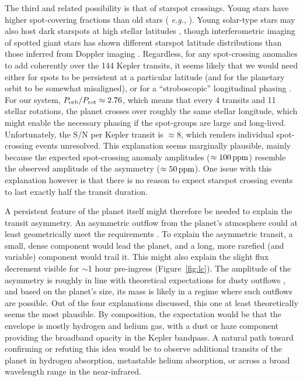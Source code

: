 \documentclass[12pt,modern,twocolumn,tighten]{aastex63}
\begin{document}
The third and related possibility is that of starspot crossings.
Young stars have higher spot-covering fractions than old stars ({\it
e.g.}, \citealt{morris_relationship_2020}).  Young solar-type stars
may also host dark starspots at high stellar latitudes \citep[{\it
e.g.}, EK~Dra;][]{strassmeier_starspots_2009}, though interferometric
imaging of spotted giant stars has shown different starspot latitude
distributions than those inferred from Doppler imaging
\citep{roettenbacher_contemporaneous_2017}.  Regardless, for any
spot-crossing anomalies to add coherently over the 144 Kepler
transits, it seems likely that we would need either for spots to be
persistent at a particular latitude (and for the planetary orbit to be
somewhat misaligned), or for a ``stroboscopic'' longitudinal phasing
\citep[{\it e.g.},][]{dai_stellar_2018}.  For our system, $P_{\rm
orb}/P_{\rm rot} \approx 2.76$, which means that every 4 transits and
11 stellar rotations, the planet crosses over roughly the same stellar
longitude, which might enable the necessary phasing if the spot-groups
are large and long-lived.  Unfortunately, the  S/N per Kepler transit
is $\approx8$, which renders individual spot-crossing events
unresolved.  This explanation seems marginally plausible, mainly
because the expected spot-crossing anomaly amplitudes ($\approx
100\,{\rm ppm}$) resemble the observed amplitude of the asymmetry
($\approx 50\,{\rm ppm}$).  One issue with this explanation however is
that there is no reason to expect starspot crossing events to last
exactly half the transit duration.

A persistent feature of the planet itself might therefore be needed to
explain the transit asymmetry.  An asymmetric outflow from the
planet's atmosphere could at least geometrically meet the requirements
\citep[{\it e.g.},][]{mccann_2019}.  To explain the asymmetric
transit, a small, dense component would lead the planet, and a long,
more rarefied (and variable) component would trail it.  This might
also explain the slight flux decrement visible for $\sim$1 hour
pre-ingress (Figure~\ref{fig:lc}).  The amplitude of the asymmetry is
roughly in line with theoretical expectations for dusty outflows
\citep{wang_dai_2019}, and based on the planet's size, its mass is
likely in a regime where such outflows are possible.  Out of the four
explanations discussed, this one at least theoretically seems the most
plausible.  By composition, the expectation would be that the envelope
is mostly hydrogen and helium gas, with a dust or haze component
providing the broadband opacity in the Kepler bandpass.  A natural
path toward confirming or refuting this idea would be to observe
additional transits of the planet in hydrogen absorption, metastable
helium absorption, or across a broad wavelength range in the
near-infrared.
\end{document}
